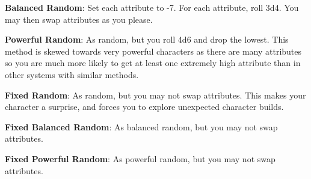 \begin{multicols*}{2}
    \textbf{Balanced Random}: Set each attribute to -7. For each attribute,
    roll 3d4. You may then swap attributes as you please.

    \textbf{Powerful Random}: As random, but you roll 4d6 and drop the lowest.
    This method is skewed towards very powerful characters as there are many
    attributes so you are much more likely to get at least one extremely high
    attribute than in other systems with similar methods.

    \textbf{Fixed Random}: As random, but you may not swap attributes. This
    makes your character a surprise, and forces you to explore unexpected
    character builds.

    \textbf{Fixed Balanced Random}: As balanced random, but you may not swap
    attributes.

    \textbf{Fixed Powerful Random}: As powerful random, but you may not swap
    attributes.

\end{multicols*}




